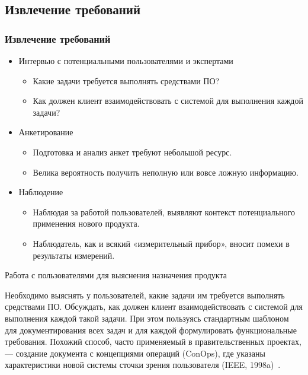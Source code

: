 \documentclass{../industrial-development}
\begin{document}
\subsection{Извлечение требований}
\begin{frame} \frametitle{Извлечение требований}
\begin{itemize}

\item \alert{Интервью с потенциальными пользователями и экспертами}
\begin{itemize} 
\item Какие задачи требуется выполнять средствами ПО? 
\item Как должен клиент взаимодействовать с
системой для выполнения каждой задачи? 
\end{itemize}

\item \alert{Анкетирование}
\begin{itemize} 
\item Подготовка и анализ анкет требуют небольшой ресурс.
\item Велика вероятность получить неполную или вовсе ложную информацию. 
\end{itemize}

\item \alert{Наблюдение}
\begin{itemize} 
\item Наблюдая за работой пользователей, выявляют контекст потенциального применения нового продукта.
\item Наблюдатель, как и всякий «измерительный прибор», вносит помехи в результаты измерений.
\end{itemize} 

\end{itemize}
\end{frame}

\lecturenotes

\alert{Работа с пользователями для выяснения назначения продукта}

Необходимо выяснять у пользователей, какие задачи им требуется выполнять средствами ПО. Обсуждать, как должен клиент взаимодействовать с системой для выполнения каждой такой задачи. При 
этом пользуясь стандартным шаблоном для документирования всех задач и для каждой формулировать функциональные требования. Похожий способ, часто применяемый в правительственных проектах, — создание документа с
концепциями операций (ConOps), где указаны характеристики новой системы сточки зрения пользователя (IEEE, 1998a)~\cite[с.~46]{Wiegers}.
\end{document}
